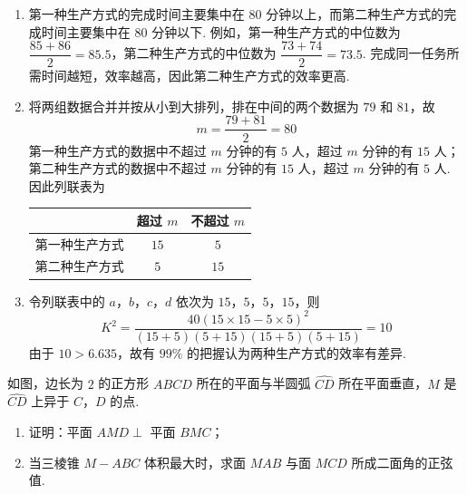 \begin{solution}
\begin{enumerate}
\item 第一种生产方式的完成时间主要集中在 \(80\) 分钟以上，而第二种生产方式的完成时间主要集中在 \(80\) 分钟以下. 例如，第一种生产方式的中位数为 \(\dfrac{85+86}{2}=85.5\)，第二种生产方式的中位数为 \(\dfrac{73+74}{2}=73.5\). 完成同一任务所需时间越短，效率越高，因此第二种生产方式的效率更高.
\item 将两组数据合并并按从小到大排列，排在中间的两个数据为 \(79\) 和 \(81\)，故
\[
m=\dfrac{79+81}{2}=80
\]
第一种生产方式的数据中不超过 \(m\) 分钟的有 \(5\) 人，超过 \(m\) 分钟的有 \(15\) 人；第二种生产方式的数据中不超过 \(m\) 分钟的有 \(15\) 人，超过 \(m\) 分钟的有 \(5\) 人. 因此列联表为
\begin{center}
\begin{tabular}{c|c|c}
 & 超过 \(m\) & 不超过 \(m\) \\
\hline
第一种生产方式 & \(15\) & \(5\) \\
\hline
第二种生产方式 & \(5\) & \(15\)
\end{tabular}
\end{center}
\item 令列联表中的 \(a\)，\(b\)，\(c\)，\(d\) 依次为 \(15\)，\(5\)，\(5\)，\(15\)，则
\[
K^2=\dfrac{40(15\times15-5\times5)^2}{(15+5)(5+15)(15+5)(5+15)}
=10
\]
由于 \(10>6.635\)，故有 \(99\%\) 的把握认为两种生产方式的效率有差异.
\end{enumerate}
\end{solution}

\begin{problem}
如图，边长为 \(2\) 的正方形 \(ABCD\) 所在的平面与半圆弧 \(\widehat{CD}\) 所在平面垂直，\(M\) 是 \(\widehat{CD}\) 上异于 \(C\)，\(D\) 的点.

\begin{enumerate}
\item 证明：平面 \(AMD\perp\) 平面 \(BMC\)；
\item 当三棱锥 \(M-ABC\) 体积最大时，求面 \(MAB\) 与面 \(MCD\) 所成二面角的正弦值.
\end{enumerate}

\end{problem}

